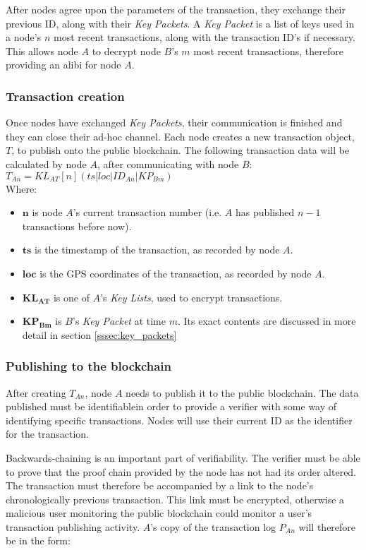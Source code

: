 \documentclass[12pt]{article}
\begin{document}
After nodes agree upon the parameters of the transaction, they exchange their previous ID, along with their \textit{Key Packets}. A \textit{Key Packet} is a list of keys used in a node's $n$ most recent transactions, along with the transaction ID's if necessary. This allows node $A$ to decrypt node $B$'s $m$ most recent transactions, therefore providing an alibi for node $A$.

\subsubsection{Transaction creation}
Once nodes have exchanged \textit{Key Packets}, their communication is finished and they can close their ad-hoc channel. Each node creates a new transaction object, $T$, to publish onto the public blockchain. The following transaction data will be calculated by node $A$, after communicating with node $B$:
\\

$T_{An} = KL_{AT}[n](ts|loc|ID_{An}|KP_{Bm})$
\\

Where:
\begin{itemize}[noitemsep,topsep=0pt]
	\item[] $\mathbf{n}$ is node $A$'s current transaction number (i.e. $A$ has published $n-1$ transactions before now).
	\item[] $\mathbf{ts}$ is the timestamp of the transaction, as recorded by node $A$.
	\item[] $\mathbf{loc}$ is the GPS coordinates of the transaction, as recorded by node $A$.
	\item[] $\mathbf{KL_{AT}}$ is one of $A$'s \textit{Key Lists}, used to encrypt transactions.
	\item[] $\mathbf{KP_{Bm}}$ is $B$'s \textit{Key Packet} at time $m$. Its exact contents are discussed in more detail in section \ref{sssec:key_packets}
\end{itemize}

\subsubsection{Publishing to the blockchain}
After creating $T_{An}$, node $A$ needs to publish it to the public blockchain. The data published must be identifiablein order to provide a verifier with some way of identifying specific transactions. Nodes will use their current ID as the identifier for the transaction.

Backwards-chaining is an important part of verifiability. The verifier must be able to prove that the proof chain provided by the node has not had its order altered. The transaction must therefore be accompanied by a link to the node's chronologically previous transaction. This link must be encrypted, otherwise a malicious user monitoring the public blockchain could monitor a user's transaction publishing activity. $A$'s copy of the transaction log $P_{An}$ will therefore be in the form:
\\
\end{document}
